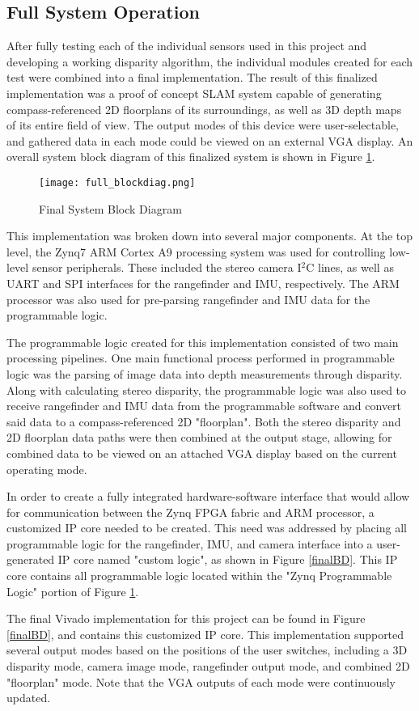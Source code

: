\subsection{Full System Operation}
After fully testing each of the individual sensors used in this project and developing a working disparity algorithm, the individual modules created for each test were combined into a final implementation.  The result of this finalized implementation was a proof of concept SLAM system capable of generating compass-referenced 2D floorplans of its surroundings, as well as 3D depth maps of its entire field of view. The output modes of this device were user-selectable, and gathered data in each mode could be viewed on an external VGA display. An overall system block diagram of this finalized system is shown in Figure \ref{systemBD2}.

\begin{figure}[H] 
	\centerline{
	\texttt{[image: full\_blockdiag.png]}
	}
	\caption{Final System Block Diagram}
	\label{systemBD2}
\end{figure}

This implementation was broken down into several major components. At the top level, the Zynq7 ARM Cortex A9 processing system was used for controlling low-level sensor peripherals. These included the stereo camera I$^2$C lines, as well as UART and SPI interfaces for the rangefinder and IMU, respectively. The ARM processor was also used for pre-parsing rangefinder and IMU data for the programmable logic. 
\par
The programmable logic created for this implementation consisted of two main processing pipelines. One main functional process performed in programmable logic was the parsing of image data into depth measurements through disparity. Along with calculating stereo disparity, the programmable logic was also used to receive rangefinder and IMU data from the programmable software and convert said data to a compass-referenced 2D "floorplan". Both the stereo disparity and 2D floorplan data paths were then combined at the output stage, allowing for combined data to be viewed on an attached VGA display based on the current operating mode. 
\par
In order to create a fully integrated hardware-software interface that would allow for communication between the Zynq FPGA fabric and ARM processor, a customized IP core needed to be created. This need was addressed by placing all programmable logic for the rangefinder, IMU, and camera interface into a user-generated IP core named "custom logic", as shown in Figure \ref{finalBD}. This IP core contains all programmable logic located within the "Zynq Programmable Logic" portion of Figure \ref{systemBD2}. 
\par
The final Vivado implementation for this project can be found in Figure \ref{finalBD}, and contains this customized IP core. This implementation supported several output modes based on the positions of the user switches, including a 3D disparity mode, camera image mode, rangefinder output mode, and combined 2D "floorplan" mode. Note that the VGA outputs of each mode were continuously updated.

